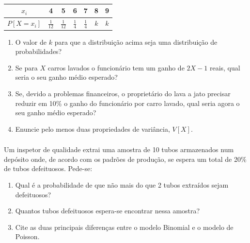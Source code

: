 \documentclass[14pt,aspectratio=1610]{beamer}
\begin{document}
\begin{frame}{}
\frametitle{}
\begin{block}{}
\justifying
\footnotesize
\begin{table}[!ht]
\centering
\renewcommand{\arraystretch}{1.8}
\begin{tabular}{c|cccccc}
\hline
		$x_i$ & 4 & 5 & 6 & 7 & 8 & 9 \\
\hline
		 $P\left[X=x_i\right]$ & $\frac{1}{12}$ & $\frac{1}{12}$ & $\frac{1}{4}$ & $\frac{1}{4}$ & $k$ & $k$ \\
\hline
\end{tabular}
\end{table}

\begin{enumerate}
\item O valor de $k$ para que a distribuição acima seja uma distribuição de probabilidades?
\item Se para $X$ carros lavados o funcionário tem um ganho de $2X-1$ reais, qual seria o seu ganho médio esperado?
\item Se, devido a problemas financeiros, o proprietário do lava a jato precisar reduzir em 10\% o ganho do funcionário por carro lavado, qual seria agora o seu ganho médio esperado?
\item  Enuncie pelo menos duas propriedades de variância, $V\left[X\right]$.
\end{enumerate}
\end{block}
\end{frame}

\begin{frame}{}
\frametitle{}
\begin{block}{}
\justifying
Um inspetor de qualidade extrai uma amostra de 10 tubos armazenados num depósito onde, de acordo com os padrões de produção, se espera um total de 20\% de tubos defeituosos. Pede-se:
\begin{enumerate}
\item Qual é a probabilidade de que não mais do que 2 tubos extraídos sejam defeituosos?
\item Quantos tubos defeituosos espera-se encontrar nessa amostra?
\item Cite as duas principais diferenças entre o modelo Binomial e o modelo de Poisson.
\end{enumerate}
\end{block}
\end{frame}
\end{document}
